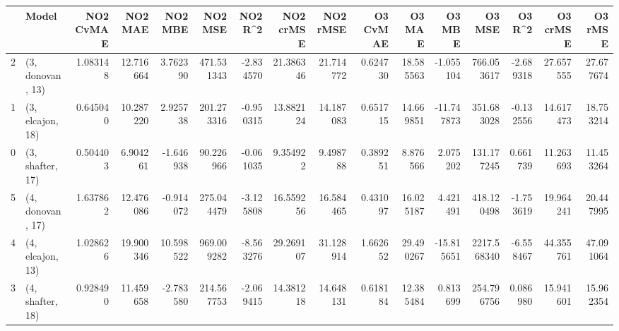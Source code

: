 \begin{tabular}{llrrrrrrrrrrrrrr}
\toprule
{} &             Model &  NO2 CvMAE &    NO2 MAE &    NO2 MBE &     NO2 MSE &   NO2 R\textasciicircum2 &  NO2 crMSE &   NO2 rMSE &  O3 CvMAE &     O3 MAE &     O3 MBE &       O3 MSE &    O3 R\textasciicircum2 &   O3 crMSE &    O3 rMSE \\
\midrule
2 &  (3, donovan, 13) &   1.083148 &  12.716664 &   3.762390 &  471.531343 & -2.834570 &  21.386346 &  21.714772 &  0.624730 &  18.585563 &  -1.055104 &   766.053617 & -2.689318 &  27.657555 &  27.677674 \\
1 &  (3, elcajon, 18) &   0.645040 &  10.287220 &   2.925738 &  201.273316 & -0.950315 &  13.882124 &  14.187083 &  0.651715 &  14.669851 & -11.747873 &   351.683028 & -0.132556 &  14.617473 &  18.753214 \\
0 &  (3, shafter, 17) &   0.504403 &   6.904261 &  -1.646938 &   90.226966 & -0.061035 &   9.354922 &   9.498788 &  0.389251 &   8.876566 &   2.075202 &   131.177245 &  0.661739 &  11.263693 &  11.453264 \\
5 &  (4, donovan, 17) &   1.637862 &  12.476086 &  -0.914072 &  275.044479 & -3.125808 &  16.559256 &  16.584465 &  0.431097 &  16.025187 &   4.421491 &   418.120498 & -1.753619 &  19.964241 &  20.447995 \\
4 &  (4, elcajon, 13) &   1.028626 &  19.900346 &  10.598522 &  969.009282 & -8.563276 &  29.269107 &  31.128914 &  1.662652 &  29.490267 & -15.815651 &  2217.568340 & -6.558467 &  44.355761 &  47.091064 \\
3 &  (4, shafter, 18) &   0.928490 &  11.459658 &  -2.783580 &  214.567753 & -2.069415 &  14.381218 &  14.648131 &  0.618184 &  12.385484 &   0.813699 &   254.796756 &  0.086980 &  15.941601 &  15.962354 \\
\bottomrule
\end{tabular}
